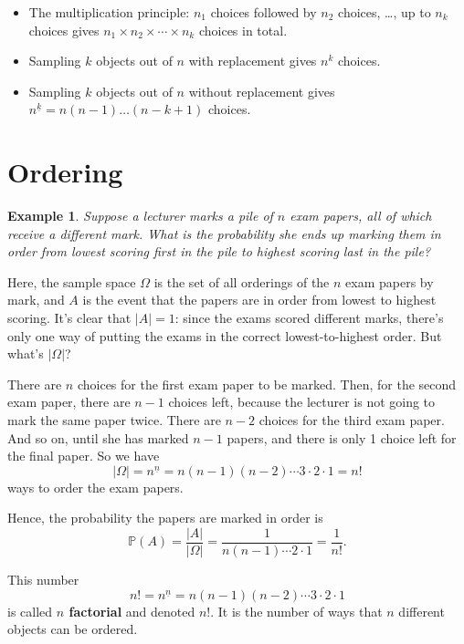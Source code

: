 \documentclass[
  a4paper,
]{book}
\providecommand{\tightlist}{%
  \setlength{\itemsep}{0pt}\setlength{\parskip}{0pt}}
\theoremstyle{definition}
\theoremstyle{definition}
\newtheorem{example}{Example}[chapter]
\theoremstyle{definition}
\theoremstyle{definition}
\theoremstyle{remark}
\begin{document}
\begin{itemize}
\tightlist
\item
  The multiplication principle: \(n_1\) choices followed by \(n_2\) choices, \ldots, up to \(n_k\) choices gives \(n_1 \times n_2 \times \cdots \times n_k\) choices in total.
\item
  Sampling \(k\) objects out of \(n\) with replacement gives \(n^k\) choices.
\item
  Sampling \(k\) objects out of \(n\) without replacement gives \(n^{\underline{k}} = n(n-1)\dots(n-k+1)\) choices.
\end{itemize}

\hypertarget{ordering}{%
\section{Ordering}\label{ordering}}

\begin{example}
\emph{Suppose a lecturer marks a pile of \(n\) exam papers, all of which receive a different mark. What is the probability she ends up marking them in order from lowest scoring first in the pile to highest scoring last in the pile?}

Here, the sample space \(\Omega\) is the set of all orderings of the \(n\) exam papers by mark, and \(A\) is the event that the papers are in order from lowest to highest scoring. It's clear that \(|A| = 1\): since the exams scored different marks, there's only one way of putting the exams in the correct lowest-to-highest order. But what's \(|\Omega|\)?

There are \(n\) choices for the first exam paper to be marked. Then, for the second exam paper, there are \(n - 1\) choices left, because the lecturer is not going to mark the same paper twice. There are \(n-2\) choices for the third exam paper. And so on, until she has marked \(n-1\) papers, and there is only 1 choice left for the final paper. So we have
\[ |\Omega| = {n}^{\underline{n}} = n(n-1)(n-2)\cdots3\cdot2\cdot1 = n! \]
ways to order the exam papers.

Hence, the probability the papers are marked in order is
\[ \mathbb P(A) = \frac{|A|}{|\Omega|} = \frac{1}{n(n-1)\cdots2\cdot1} = \frac{1}{n!} . \]
\end{example}

This number
\[ n! = {n}^{\underline{n}} = n(n-1)(n-2)\cdots3\cdot2\cdot1 \]
is called \textbf{\(n\) factorial} and denoted \(n!\). It is the number of ways that \(n\) different objects can be ordered.
\end{document}
